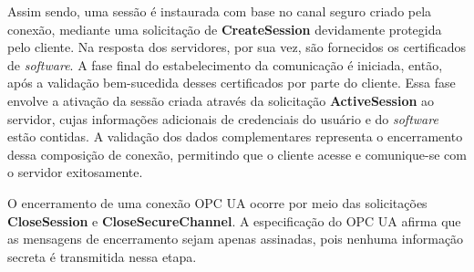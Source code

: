         Assim sendo, uma sessão é instaurada com base no canal seguro criado pela conexão, mediante uma solicitação de \textbf{CreateSession} devidamente protegida pelo cliente. Na resposta dos servidores, por sua vez, são fornecidos os certificados de \textit{software}. A fase final do estabelecimento da comunicação é iniciada, então, após a validação bem-sucedida desses certificados por parte do cliente. Essa fase envolve a ativação da sessão criada através da solicitação \textbf{ActiveSession} ao servidor, cujas informações adicionais de credenciais do usuário e do \textit{software} estão contidas. A validação dos dados complementares representa o encerramento dessa composição de conexão, permitindo que o cliente acesse e comunique-se com o servidor exitosamente.

        O encerramento de uma conexão OPC UA ocorre por meio das solicitações \textbf{CloseSession} e \textbf{CloseSecureChannel}. A especificação do OPC UA \cite{opc2022} afirma que as mensagens de encerramento sejam apenas assinadas, pois nenhuma informação secreta é transmitida nessa etapa.

